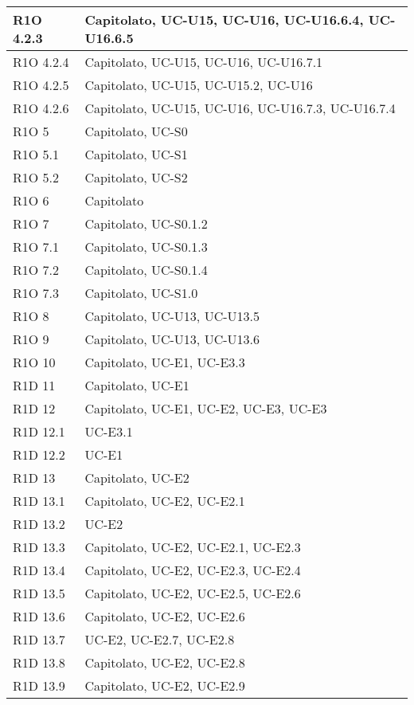 \begin{center}
\begin{longtable}{ | l | p{8cm} | }
    R1O 4.2.3 & Capitolato, UC-U15, UC-U16, UC-U16.6.4, UC-U16.6.5 \\ \hline
    R1O 4.2.4 & Capitolato, UC-U15, UC-U16, UC-U16.7.1 \\ \hline
    R1O 4.2.5 & Capitolato, UC-U15, UC-U15.2, UC-U16 \\ \hline
    R1O 4.2.6 & Capitolato, UC-U15, UC-U16, UC-U16.7.3, UC-U16.7.4 \\ \hline
    R1O 5 & Capitolato, UC-S0 \\ \hline
    R1O 5.1 & Capitolato, UC-S1 \\ \hline
    R1O 5.2 & Capitolato, UC-S2 \\ \hline
    R1O 6 & Capitolato \\ \hline
    R1O 7 & Capitolato, UC-S0.1.2 \\ \hline
    R1O 7.1 & Capitolato, UC-S0.1.3 \\ \hline
    R1O 7.2 & Capitolato, UC-S0.1.4 \\ \hline
    R1O 7.3 & Capitolato, UC-S1.0 \\ \hline
    R1O 8 & Capitolato, UC-U13, UC-U13.5 \\ \hline
    R1O 9 & Capitolato, UC-U13, UC-U13.6 \\ \hline
    R1O 10 & Capitolato, UC-E1, UC-E3.3 \\ \hline
    R1D 11 & Capitolato, UC-E1 \\ \hline
    R1D 12 & Capitolato, UC-E1, UC-E2, UC-E3, UC-E3  \\ \hline
    R1D 12.1 & UC-E3.1  \\ \hline
    R1D 12.2 & UC-E1  \\ \hline
    R1D 13 & Capitolato, UC-E2 \\ \hline
    R1D 13.1 & Capitolato, UC-E2, UC-E2.1  \\ \hline
    R1D 13.2 & UC-E2 \\ \hline
    R1D 13.3 & Capitolato, UC-E2, UC-E2.1, UC-E2.3 \\ \hline
    R1D 13.4 & Capitolato, UC-E2, UC-E2.3, UC-E2.4  \\ \hline
    R1D 13.5 & Capitolato, UC-E2, UC-E2.5, UC-E2.6 \\ \hline
    R1D 13.6 & Capitolato, UC-E2, UC-E2.6 \\ \hline
    R1D 13.7 & UC-E2, UC-E2.7, UC-E2.8 \\ \hline
    R1D 13.8 & Capitolato, UC-E2, UC-E2.8 \\ \hline
    R1D 13.9 & Capitolato, UC-E2, UC-E2.9 \\ \hline

\end{longtable}
\end{center}
